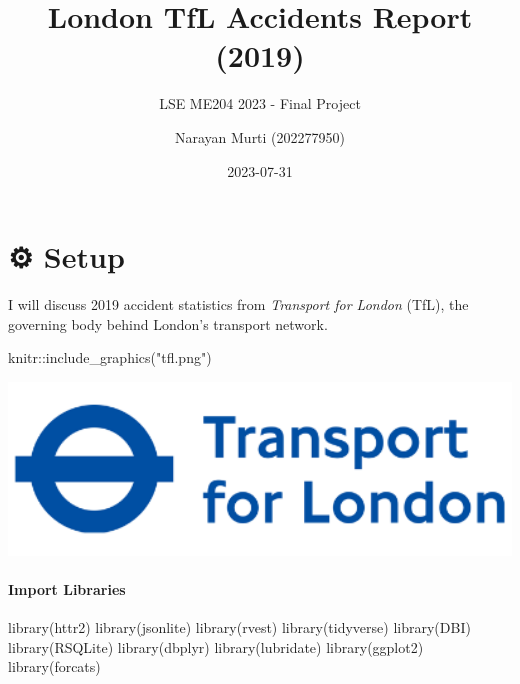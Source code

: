 \documentclass[
]{article}
\title{London TfL Accidents Report (2019)}
\subtitle{LSE ME204 2023 - Final Project}
\author{Narayan Murti (202277950)}
\date{2023-07-31}
\newenvironment{Shaded}{\begin{snugshade}}{\end{snugshade}}
\newcommand{\FunctionTok}[1]{\textcolor[rgb]{0.00,0.00,0.00}{#1}}
\newcommand{\NormalTok}[1]{#1}
\newcommand{\SpecialCharTok}[1]{\textcolor[rgb]{0.00,0.00,0.00}{#1}}
\newcommand{\StringTok}[1]{\textcolor[rgb]{0.31,0.60,0.02}{#1}}
\begin{document}
\maketitle

{
\setcounter{tocdepth}{2}
\tableofcontents
}
\hypertarget{setup}{%
\section{⚙️ Setup}\label{setup}}

I will discuss 2019 accident statistics from \emph{Transport for London}
(TfL), the governing body behind London's transport network.

\begin{Shaded}
\begin{Highlighting}[]
\NormalTok{knitr}\SpecialCharTok{::}\FunctionTok{include\_graphics}\NormalTok{(}\StringTok{"tfl.png"}\NormalTok{)}
\end{Highlighting}
\end{Shaded}

\includegraphics[width=5.56in]{tfl}

\hypertarget{import-libraries}{%
\paragraph{Import Libraries}\label{import-libraries}}

\begin{Shaded}
\begin{Highlighting}[]
\FunctionTok{library}\NormalTok{(httr2)}
\FunctionTok{library}\NormalTok{(jsonlite)}
\FunctionTok{library}\NormalTok{(rvest)}
\FunctionTok{library}\NormalTok{(tidyverse)}
\FunctionTok{library}\NormalTok{(DBI)}
\FunctionTok{library}\NormalTok{(RSQLite)}
\FunctionTok{library}\NormalTok{(dbplyr)}
\FunctionTok{library}\NormalTok{(lubridate)}
\FunctionTok{library}\NormalTok{(ggplot2)}
\FunctionTok{library}\NormalTok{(forcats)}
\end{Highlighting}
\end{Shaded}
\end{document}
